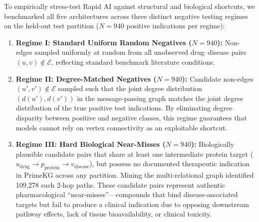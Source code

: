 \documentclass[preprint,12pt]{elsarticle}
\begin{document}
To empirically stress-test Rapid AI against structural and biological shortcuts, we benchmarked all five architectures across three distinct negative testing regimes on the held-out test partition ($N = 940$ positive indications per regime):
\begin{enumerate}
    \item \textbf{Regime I: Standard Uniform Random Negatives ($N = 940$):} Non-edges sampled uniformly at random from all unobserved drug--disease pairs $(u, v) \notin \mathcal{E}$, reflecting standard benchmark literature conditions.
    \item \textbf{Regime II: Degree-Matched Negatives ($N = 940$):} Candidate non-edges $(u', v') \notin \mathcal{E}$ sampled such that the joint degree distribution $(d(u'), d(v'))$ in the message-passing graph matches the joint degree distribution of the true positive test indications. By eliminating degree disparity between positive and negative classes, this regime guarantees that models cannot rely on vertex connectivity as an exploitable shortcut.
    \item \textbf{Regime III: Hard Biological Near-Misses ($N = 940$):} Biologically plausible candidate pairs that share at least one intermediate protein target ($u_{\text{drug}} \to p_{\text{protein}} \to v_{\text{disease}}$), but possess no documented therapeutic indication in PrimeKG across any partition. Mining the multi-relational graph identified 109,278 such 2-hop paths. These candidate pairs represent authentic pharmacological ``near-misses''—compounds that bind disease-associated targets but fail to produce a clinical indication due to opposing downstream pathway effects, lack of tissue bioavailability, or clinical toxicity.
\end{enumerate}
\end{document}
